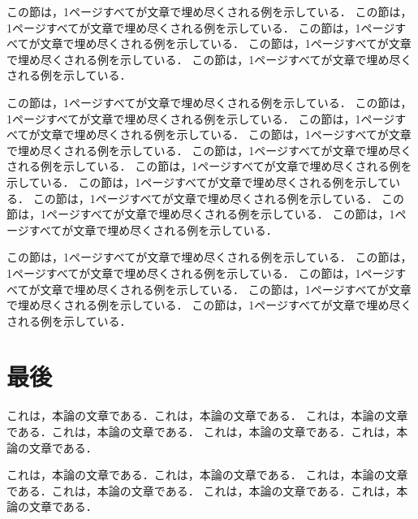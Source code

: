この節は，1ページすべてが文章で埋め尽くされる例を示している．
この節は，1ページすべてが文章で埋め尽くされる例を示している．
この節は，1ページすべてが文章で埋め尽くされる例を示している．
この節は，1ページすべてが文章で埋め尽くされる例を示している．
この節は，1ページすべてが文章で埋め尽くされる例を示している．

この節は，1ページすべてが文章で埋め尽くされる例を示している．
この節は，1ページすべてが文章で埋め尽くされる例を示している．
この節は，1ページすべてが文章で埋め尽くされる例を示している．
この節は，1ページすべてが文章で埋め尽くされる例を示している．
この節は，1ページすべてが文章で埋め尽くされる例を示している．
この節は，1ページすべてが文章で埋め尽くされる例を示している．
この節は，1ページすべてが文章で埋め尽くされる例を示している．
この節は，1ページすべてが文章で埋め尽くされる例を示している．
この節は，1ページすべてが文章で埋め尽くされる例を示している．
この節は，1ページすべてが文章で埋め尽くされる例を示している．

この節は，1ページすべてが文章で埋め尽くされる例を示している．
この節は，1ページすべてが文章で埋め尽くされる例を示している．
この節は，1ページすべてが文章で埋め尽くされる例を示している．
この節は，1ページすべてが文章で埋め尽くされる例を示している．
この節は，1ページすべてが文章で埋め尽くされる例を示している．


\section{最後}

これは，本論の文章である．これは，本論の文章である．
これは，本論の文章である．これは，本論の文章である．
これは，本論の文章である．これは，本論の文章である．

これは，本論の文章である．これは，本論の文章である．
これは，本論の文章である．これは，本論の文章である．
これは，本論の文章である．これは，本論の文章である．

